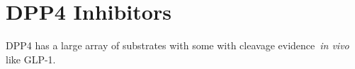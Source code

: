 \section{DPP4 Inhibitors}
DPP4 has a large array of substrates with some with cleavage evidence~\textit{in vivo} like GLP-1. 